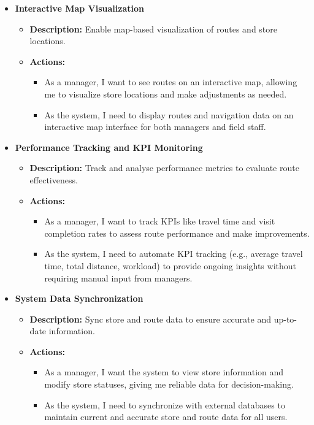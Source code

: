\begin{itemize}
    \item \textbf{Interactive Map Visualization}
    \begin{itemize}
        \item \textbf{Description:} Enable map-based visualization of routes and store locations.
        \item \textbf{Actions:}
        \begin{itemize}
            \item As a manager, I want to see routes on an interactive map, allowing me to visualize store locations and make adjustments as needed.
            \item As the system, I need to display routes and navigation data on an interactive map interface for both managers and field staff.
        \end{itemize}
    \end{itemize}
    
    \item \textbf{Performance Tracking and KPI Monitoring}
    \begin{itemize}
        \item \textbf{Description:} Track and analyse performance metrics to evaluate route effectiveness.
        \item \textbf{Actions:}
        \begin{itemize}
            \item As a manager, I want to track KPIs like travel time and visit completion rates to assess route performance and make improvements.
            \item As the system, I need to automate KPI tracking (e.g., average travel time, total distance, workload) to provide ongoing insights without requiring manual input from managers.
        \end{itemize}
    \end{itemize}
    
    \item \textbf{System Data Synchronization}
    \begin{itemize}
        \item \textbf{Description:} Sync store and route data to ensure accurate and up-to-date information.
        \item \textbf{Actions:}
        \begin{itemize}
            \item As a manager, I want the system to view store information and modify store statuses, giving me reliable data for decision-making.
            \item As the system, I need to synchronize with external databases to maintain current and accurate store and route data for all users.
        \end{itemize}
    \end{itemize}
    

    
\end{itemize}

